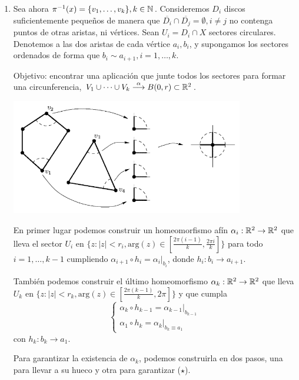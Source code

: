 {\begin{enumerate}
        \item Sea ahora $\pi^{-1}(x) = \{v_1, \dots, v_k\}, k \in \mathbb{N}$. Consideremos $D_i$ discos suficientemente pequeños de manera que $\overline{D_i} \cap \overline{D_j} = \emptyset, i \neq j$ no contenga puntos de otras aristas, ni vértices. 
        Sean $U_i = D_i \cap X$ sectores circulares. Denotemos a las dos aristas de cada vértice $a_i,b_i$, y supongamos los sectores ordenados de forma que $b_i \sim a_{i+1}, i=1,\dots,k$.

        Objetivo: encontrar una aplicación que junte todos los sectores para formar una circunferencia, $V_1 \cup \dots \cup V_k \overset{\alpha}{\longrightarrow} B(0,r) \subset \mathbb{R}^2$. 
        
        \begin{center}
            \includegraphics[width=0.8\textwidth]{img/entornos-vertices.png}
        \end{center}

        En primer lugar podemos construir un homeomorfismo afín $\alpha_i : \mathbb{R}^2 \to \mathbb{R}^2$ que lleva el sector $U_i$ en $\{z : |z| < r_i, \text{arg}(z) \in [\frac{2\pi(i-1)}{k}, \frac{2\pi i}{k}]\}$ para todo $i=1,\dots,k-1$ cumpliendo $\alpha_{i+1} \circ h_i = \alpha_i|_{b_i}$, donde $h_i : b_i \to a_{i+1}$.
        
        También podemos construir el último homeomorfismo $\alpha_k : \mathbb{R}^2 \to \mathbb{R}^2$ que lleva $U_k$ en $\{z : |z| < r_k, \text{arg}(z) \in [\frac{2\pi(k-1)}{k}, 2\pi]\}$ y que cumpla 
        \[
            \begin{cases}
                \alpha_k \circ h_{k-1} = \alpha_{k-1}|_{b_{k-1}} \\
                \alpha_1 \circ h_k = \alpha_k|_{b_k \equiv a_1} \tag{$\star$}
            \end{cases}
        \]
        con $h_k : b_k \to a_1$.
        
        Para garantizar la existencia de $\alpha_k$, podemos construirla en dos pasos, una para llevar a su hueco y otra para garantizar ($\star$). 


\end{enumerate}}
